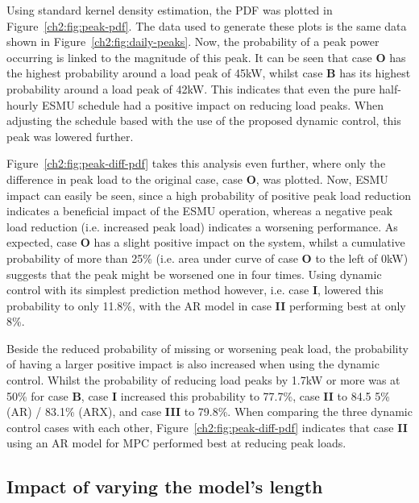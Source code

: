 

Using standard kernel density estimation, the PDF was plotted in Figure~\ref{ch2:fig:peak-pdf}.
The data used to generate these plots is the same data shown in Figure~\ref{ch2:fig:daily-peaks}.
Now, the probability of a peak power occurring is linked to the magnitude of this peak.
It can be seen that case \textbf{O} has the highest probability around a load peak of 45kW, whilst case \textbf{B} has its highest probability around a load peak of 42kW.
This indicates that even the pure half-hourly ESMU schedule had a positive impact on reducing load peaks.
When adjusting the schedule based with the use of the proposed dynamic control, this peak was lowered further.



Figure~\ref{ch2:fig:peak-diff-pdf} takes this analysis even further, where only the difference in peak load to the original case, case \textbf{O}, was plotted.
Now, ESMU impact can easily be seen, since a high probability of positive peak load reduction indicates a beneficial impact of the ESMU operation, whereas a negative peak load reduction (i.e. increased peak load) indicates a worsening performance.
As expected, case \textbf{O} has a slight positive impact on the system, whilst a cumulative probability of more than 25\% (i.e. area under curve of case \textbf{O} to the left of 0kW) suggests that the peak might be worsened one in four times.
Using dynamic control with its simplest prediction method however, i.e. case \textbf{I}, lowered this probability to only 11.8\%, with the AR model in case \textbf{II} performing best at only 8\%.

Beside the reduced probability of missing or worsening peak load, the probability of having a larger positive impact is also increased when using the dynamic control.
Whilst the probability of reducing load peaks by 1.7kW or more was at 50\% for case \textbf{B}, case \textbf{I} increased this probability to 77.7\%, case \textbf{II} to 84.5 5\% (AR) / 83.1\% (ARX), and case \textbf{III} to 79.8\%.
When comparing the three dynamic control cases with each other, Figure~\ref{ch2:fig:peak-diff-pdf} indicates that case \textbf{II} using an AR model for MPC performed best at reducing peak loads.

\subsection{Impact of varying the model's length}

